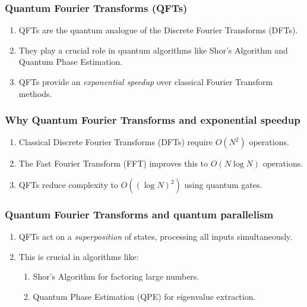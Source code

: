 \documentclass[aspectratio=169]{beamer}
\begin{document}
\begin{frame}
\frametitle{Quantum Fourier Transforms (QFTs)}

\begin{enumerate}
\item QFTs are the quantum analogue of the Discrete Fourier Transforms (DFTs).

\item They  play a crucial role in quantum algorithms like Shor’s Algorithm and Quantum Phase Estimation.

\item QFTs provide an \emph{exponential speedup} over classical Fourier Transform methods.
\end{enumerate}

\noindent
\end{frame}

\begin{frame}
\frametitle{Why Quantum Fourier Transforms and exponential speedup}

\begin{enumerate}
\item Classical Discrete Fourier Transforms (DFTs) require $O(N^2)$ operations.

\item The Fast Fourier Transform (FFT) improves this to $O(N \log N)$ operations.

\item QFTs reduce complexity to $O((\log N)^2)$ using quantum gates.
\end{enumerate}

\noindent
\end{frame}

\begin{frame}
\frametitle{Quantum Fourier Transforms and quantum parallelism}

\begin{enumerate}
\item QFTs act on a \emph{superposition} of states, processing all inputs simultaneously.

\item This is crucial in algorithms like:
\begin{enumerate}

 \item Shor’s Algorithm for factoring large numbers.

 \item Quantum Phase Estimation (QPE) for eigenvalue extraction.
\end{enumerate}

\noindent
\end{enumerate}

\noindent
\end{frame}
\end{document}
